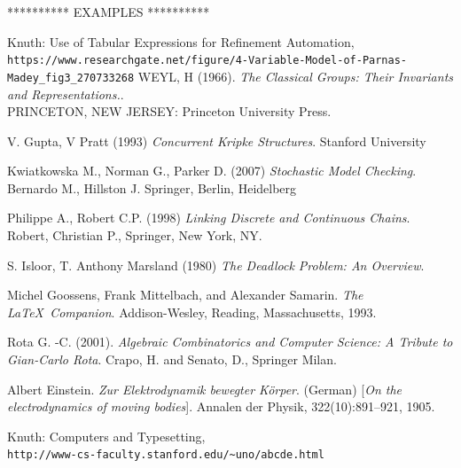 \documentclass{article}%
\begin{document}
\newpage
********** EXAMPLES **********
\begin{thebibliography}{9}

Knuth: Use of Tabular Expressions for Refinement Automation,
\\\texttt{https://www.researchgate.net/figure/4-Variable-Model-of-Parnas-Madey\_fig3\_270733268}
WEYL, H (1966).
\textit{The Classical Groups: Their Invariants and Representations.}.\\ 
PRINCETON, NEW JERSEY: Princeton University Press.

V. Gupta, V Pratt (1993)
\textit{Concurrent Kripke Structures}. 
Stanford University

Kwiatkowska M., Norman G., Parker D. (2007)
\textit{Stochastic Model Checking}. 
Bernardo M., Hillston J. Springer, Berlin, Heidelberg

Philippe A., Robert C.P. (1998)  
\textit{Linking Discrete and Continuous Chains}. 
Robert, Christian P., Springer, New York, NY.

S. Isloor, T. Anthony Marsland (1980)
\textit{The Deadlock Problem: An Overview}. 


Michel Goossens, Frank Mittelbach, and Alexander Samarin. 
\textit{The \LaTeX\ Companion}. 
Addison-Wesley, Reading, Massachusetts, 1993.

Rota G. -C. (2001).
\textit{Algebraic Combinatorics and Computer Science: A Tribute to Gian-Carlo Rota}.
Crapo, H. and Senato, D., Springer Milan.

Albert Einstein. 
\textit{Zur Elektrodynamik bewegter K{\"o}rper}. (German) 
[\textit{On the electrodynamics of moving bodies}]. 
Annalen der Physik, 322(10):891–921, 1905.

Knuth: Computers and Typesetting,
\\\texttt{http://www-cs-faculty.stanford.edu/\~{}uno/abcde.html}

\end{thebibliography}
\end{document}
